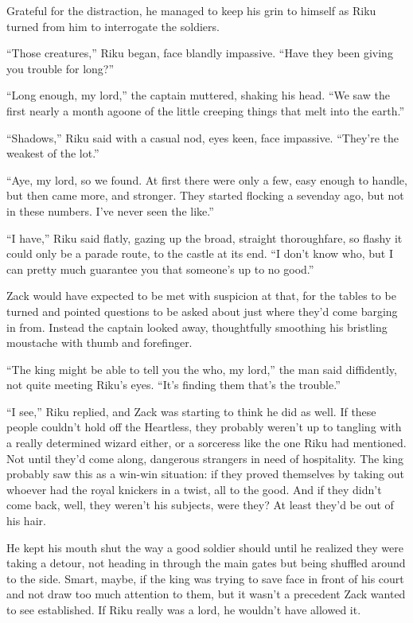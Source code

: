 Grateful for the distraction, he managed to keep his grin to himself as Riku turned from him to interrogate the soldiers.

``Those creatures,'' Riku began, face blandly impassive. ``Have they been giving you trouble for long?''

``Long enough, my lord,'' the captain muttered, shaking his head. ``We saw the first nearly a month ago\textemdash one of the little creeping things that melt into the earth.''

``Shadows,'' Riku said with a casual nod, eyes keen, face impassive. ``They're the weakest of the lot.''

``Aye, my lord, so we found. At first there were only a few, easy enough to handle, but then came more, and stronger. They started flocking a sevenday ago, but not in these numbers. I've never seen the like.''

``I have,'' Riku said flatly, gazing up the broad, straight thoroughfare, so flashy it could only be a parade route, to the castle at its end. ``I don't know who, but I can pretty much guarantee you that someone's up to no good.''

Zack would have expected to be met with suspicion at that, for the tables to be turned and pointed questions to be asked about just where they'd come barging in from. Instead the captain looked away, thoughtfully smoothing his bristling moustache with thumb and forefinger.

``The king might be able to tell you the who, my lord,'' the man said diffidently, not quite meeting Riku's eyes. ``It's finding them that's the trouble.''

``I see,'' Riku replied, and Zack was starting to think he did as well. If these people couldn't hold off the Heartless, they probably weren't up to tangling with a really determined wizard either, or a sorceress like the one Riku had mentioned. Not until they'd come along, dangerous strangers in need of hospitality. The king probably saw this as a win-win situation: if they proved themselves by taking out whoever had the royal knickers in a twist, all to the good. And if they didn't come back, well, they weren't his subjects, were they? At least they'd be out of his hair.

He kept his mouth shut the way a good soldier should until he realized they were taking a detour, not heading in through the main gates but being shuffled around to the side. Smart, maybe, if the king was trying to save face in front of his court and not draw too much attention to them, but it wasn't a precedent Zack wanted to see established. If Riku really was a lord, he wouldn't have allowed it.

